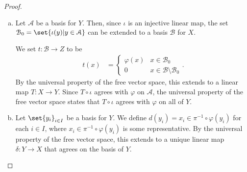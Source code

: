 \begin{proof}\hfill
  \begin{enumerate}[(a)]
    \item Let $\mathcal{A}$ be a basis for $Y$. Then, since $\iota$ is an injective linear map, the set $\mathcal{B}_0 = \set{\iota(y) | y\in \mathcal{A}}$ can be extended to a basis $\mathcal{B}$ for $X$.\newline

      We set $t\colon \mathcal{B}\rightarrow Z$ to be
      \begin{align*}
        t\left(x\right) &= \begin{cases}
          \varphi(x) & x\in \mathcal{B}_0\\
          0 & x\in \mathcal{B}\setminus \mathcal{B}_0
        \end{cases}.
      \end{align*}
      By the universal property of the free vector space, this extends to a linear map $T\colon X\rightarrow Y$. Since $T\circ\iota$ agrees with $\varphi$ on $\mathcal{A}$, the universal property of the free vector space states that $T\circ\iota$ agrees with $\varphi$ on all of $Y$.
    \item Let $\set{y_i}_{i\in I}$ be a basis for $Y$. We define $d\left( y_i \right) = x_i\in  \pi^{-1}\circ \varphi\left( y_i \right)$ for each $i\in I$, where $x_i\in \pi^{-1}\circ \varphi\left( y_i \right)$ is some representative.  By the universal property of the free vector space, this extends to a unique linear map $\delta\colon Y\rightarrow X$ that agrees on the basis of $Y$.
  \end{enumerate}
\end{proof}

